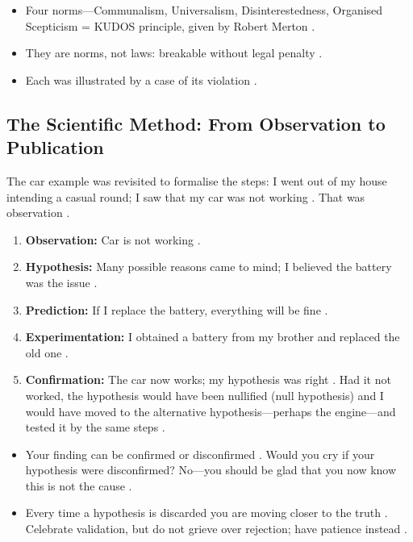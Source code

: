 \begin{QuickRevision}
\begin{itemize}
    \item Four norms---Communalism, Universalism, Disinterestedness, Organised Scepticism = KUDOS principle, given by Robert Merton .
    \item They are norms, not laws: breakable without legal penalty .
    \item Each was illustrated by a case of its violation .
\end{itemize}
\end{QuickRevision}

\subsection{The Scientific Method: From Observation to Publication}
The car example was revisited to formalise the steps: I went out of my house intending a casual round; I saw that my car was not working . That was observation .
\begin{enumerate}
    \item \textbf{Observation:} Car is not working .
    \item \textbf{Hypothesis:} Many possible reasons came to mind; I believed the battery was the issue .
    \item \textbf{Prediction:} If I replace the battery, everything will be fine .
    \item \textbf{Experimentation:} I obtained a battery from my brother and replaced the old one .
    \item \textbf{Confirmation:} The car now works; my hypothesis was right . Had it not worked, the hypothesis would have been nullified (null hypothesis) and I would have moved to the alternative hypothesis---perhaps the engine---and tested it by the same steps .
\end{enumerate}

\begin{CriticalPoint}
\begin{itemize}
    \item Your finding can be confirmed or disconfirmed . Would you cry if your hypothesis were disconfirmed? No---you should be glad that you now know this is not the cause .
    \item Every time a hypothesis is discarded you are moving closer to the truth . Celebrate validation, but do not grieve over rejection; have patience instead .
\end{itemize}
\end{CriticalPoint}

